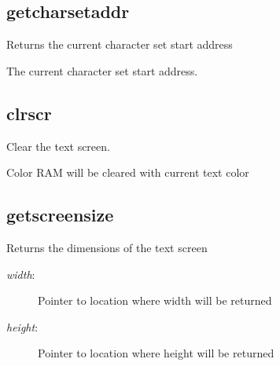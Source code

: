 \subsection{getcharsetaddr}
\begin{description}[leftmargin=2cm,style=nextline]
\item [Description:] {Returns the current character set start address}
\item [Syntax:] 
\item [Desription:] {The current character set start address.}
\end{description}

\subsection{clrscr}
\begin{description}[leftmargin=2cm,style=nextline]
\item [Description:] {Clear the text screen. }
\item [Syntax:] 
\item [Notes:] {Color RAM will be cleared with current text color}
\end{description}

\subsection{getscreensize}
\begin{description}[leftmargin=2cm,style=nextline]
\item [Description:] {Returns the dimensions of the text screen}
\item [Syntax:] 
\item [Parameters:]
\begin{description}\item[]
\item [{\em width}:] {Pointer to location where width will be returned}
\item [{\em height}:] {Pointer to location where height will be returned}
\end{description}
\end{description}

